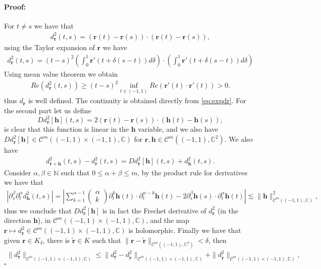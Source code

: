 \documentclass{article}
\newenvironment{proof}{\paragraph{Proof:}}{\hfill$\square$}
\newcommand{\IC}{{\mathbb C}}
\newcommand{\IN}{{\mathbb N}}
\newcommand{\cmspace}[3]{\mathcal{C}^{#1} \left( #2, #3 \right)}
\newcommand{\bh}{\bm{h}}
\newcommand{\br}{\bm{r}}
\newcommand{\iinterv}{(-1,1)\times(-1,1)}
\begin{document}
\begin{proof}
For $t \neq s$ we have that
\begin{align*}
d_{\br}^2(t,s) = (\br(t)-\br(s))\cdot (\br(t) -\br(s)),
\end{align*}
using the Taylor expansion of $\br$ we have 
\begin{align}
\label{eq:expdr}
d_{\br}^2(t,s) = (t-s)^2 \left(\int_{0}^1 \br'(t+\delta(s-t))d\delta \right) \cdot \left(\int_{0}^1 \br'(t+\delta(s-t))d\delta \right)
\end{align}
Using mean value theorem we obtain 
\begin{align*}
Re ( d_{\br}^2(t,s)  )  \geq (t-s)^2 \inf_{t \in (-1,1)} Re(\br'(t) \cdot \br'(t)) >0.
\end{align*}
thus $d_{\br}$ is well defined. The continuity is obtained directly from \eqref{eq:expdr}. For the second part let us define 
$$
D d_{\br}^2[\bh](t,s) = 2 (\br(t)-\br(s))\cdot (\bh(t) - \bh(s)),
$$
is clear that this function is linear in the $\bh$ variable, and we also have $D d_{\br}^2[\bh] \in \cmspace{m}{\iinterv}{\IC}$ for $\br,\bh \in \cmspace{m}{(-1,1)}{\IC^2}$. We also have 
\begin{align*}
d^2_{\br+\bh}(t,s) -d^2_{\br}(t,s) =  D d_{\br}^2[\bh](t,s) + d^2_{\bh}(t,s).
\end{align*}
Consider $\alpha, \beta \in \IN$ such that $0 \leq \alpha +\beta \leq m$, by the product rule for derivatives we have that 
\begin{align*}
 \left\vert\partial_s^\beta \partial_t^\alpha d^2_{\bh}(t,s) \right\vert= \left\vert\sum_{k=1}^{\alpha-1} \begin{pmatrix} \alpha \\ k \end{pmatrix} \partial_t^k \bh(t) \cdot \partial^{\alpha-k}_t \bh(t) - 2\partial_s^\beta \bh(s) \cdot \partial^\alpha_t \bh(t)\right\vert \lesssim \| \bh\|^2_{\cmspace{m}{(-1,1)}{\IC}},
\end{align*} 
thus we conclude that $D d_{\br}^2[\bh]$ is in fact the Frechet derivative of $d^2_{\br}$ (in the direction $\bh$), in $\cmspace{m}{\iinterv}{\IC}$, and the map $\br  \mapsto d_{\br}^2 \in \cmspace{m}{(-1,1)\times(-1,1)}{\IC}$ is holomorphic. Finally we have that given $\br \in K_\delta$, there is $\widetilde{\br} \in K$ such that $\| \br - \widetilde{\br}\|_{\cmspace{m}{(-1,1)}{\IC^2}} < \delta$, then 
\begin{align*}
\| d^2_{\br} \|_{\cmspace{m}{\iinterv}{\IC}} \leq \| d^2_{\br}  - d_{\widetilde{\br}}^2 \|_{\cmspace{m}{\iinterv}{\IC}}  + \| d_{\widetilde{\br}}^2 \|_{\cmspace{m}{\iinterv}{\IC}},

\end{align*}
\end{proof}
\end{document}
